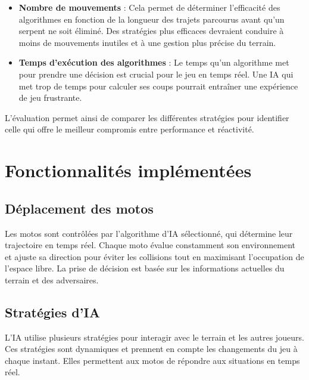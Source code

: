 \documentclass[a4paper,12pt]{article}
\begin{document}
\begin{itemize}
    \item \textbf{Nombre de mouvements} : Cela permet de déterminer l’efficacité des algorithmes en fonction de la longueur des trajets parcourus avant qu’un serpent ne soit éliminé. Des stratégies plus efficaces devraient conduire à moins de mouvements inutiles et à une gestion plus précise du terrain.
    \item \textbf{Temps d'exécution des algorithmes} : Le temps qu’un algorithme met pour prendre une décision est crucial pour le jeu en temps réel. Une IA qui met trop de temps pour calculer ses coups pourrait entraîner une expérience de jeu frustrante.
\end{itemize}

L'évaluation permet ainsi de comparer les différentes stratégies pour identifier celle qui offre le meilleur compromis entre performance et réactivité.

\newpage

\section{Fonctionnalités implémentées}

\subsection{Déplacement des motos}
Les motos sont contrôlées par l’algorithme d'IA sélectionné, qui détermine leur trajectoire en temps réel. Chaque moto évalue constamment son environnement et ajuste sa direction pour éviter les collisions tout en maximisant l'occupation de l'espace libre. La prise de décision est basée sur les informations actuelles du terrain et des adversaires.

\subsection{Stratégies d'IA}
L'IA utilise plusieurs stratégies pour interagir avec le terrain et les autres joueurs. Ces stratégies sont dynamiques et prennent en compte les changements du jeu à chaque instant. Elles permettent aux motos de répondre aux situations en temps réel.
\end{document}

